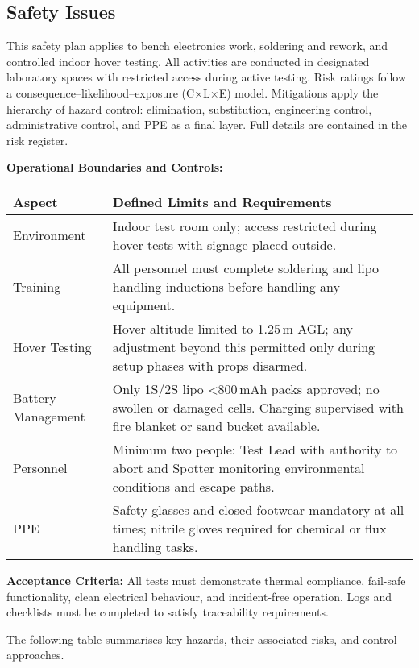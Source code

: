 
\subsection{Safety Issues}
This safety plan applies to bench electronics work, soldering and rework, and controlled indoor hover testing. All activities are conducted in designated laboratory spaces with restricted access during active testing. Risk ratings follow a consequence–likelihood–exposure (C×L×E) model. Mitigations apply the hierarchy of hazard control: elimination, substitution, engineering control, administrative control, and PPE as a final layer. Full details are contained in the risk register.

\vspace{0.5em}
\textbf{Operational Boundaries and Controls:}

\begin{tabular}{|p{4cm}|p{11.5cm}|}
\hline
\rowcolor{gray!15}\textbf{Aspect} & \textbf{Defined Limits and Requirements} \\ \hline
Environment & Indoor test room only; access restricted during hover tests with signage placed outside. \\ \hline
Training & All personnel must complete soldering and \gls{lipo} handling inductions before handling any equipment. \\ \hline
Hover Testing & Hover altitude limited to 1.25\,m AGL; any adjustment beyond this permitted only during setup phases with props disarmed. \\ \hline
Battery Management & Only 1S/2S \gls{lipo} <800\,mAh packs approved; no swollen or damaged cells. Charging supervised with fire blanket or sand bucket available. \\ \hline
Personnel & Minimum two people: Test Lead with authority to abort and Spotter monitoring environmental conditions and escape paths. \\ \hline
PPE & Safety glasses and closed footwear mandatory at all times; nitrile gloves required for chemical or flux handling tasks. \\ \hline
\end{tabular}

\vspace{0.5em}
\textbf{Acceptance Criteria:} All tests must demonstrate thermal compliance, fail-safe functionality, clean electrical behaviour, and incident-free operation. Logs and checklists must be completed to satisfy traceability requirements.

The following table summarises key hazards, their associated risks, and control approaches.

